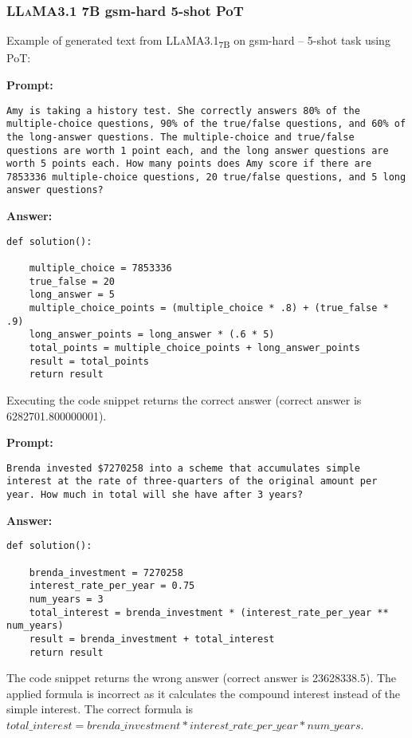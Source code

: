 	\subsubsection*{\textsc{LLaMA}3.1 7B gsm-hard 5-shot PoT}
	\noindent Example of generated text from \textsc{LLaMA}3.1\textsubscript{7B} on gsm-hard -- 5-shot task using PoT:
	\begin{displayquote}
		\textbf{Prompt:}
		\begin{Verbatim}[fontsize=\small,breaklines]
Amy is taking a history test. She correctly answers 80% of the multiple-choice questions, 90% of the true/false questions, and 60% of the long-answer questions. The multiple-choice and true/false questions are worth 1 point each, and the long answer questions are worth 5 points each. How many points does Amy score if there are 7853336 multiple-choice questions, 20 true/false questions, and 5 long answer questions?
    \end{Verbatim}
		\textbf{Answer:}
		\begin{Verbatim}[fontsize=\small,breaklines]
def solution():

    multiple_choice = 7853336
    true_false = 20
    long_answer = 5
    multiple_choice_points = (multiple_choice * .8) + (true_false * .9)
    long_answer_points = long_answer * (.6 * 5)
    total_points = multiple_choice_points + long_answer_points
    result = total_points
    return result
    \end{Verbatim}
	\end{displayquote}
	Executing the code snippet returns the correct answer (correct answer is 6282701.800000001).
	\begin{displayquote}
		\textbf{Prompt:}
		\begin{Verbatim}[fontsize=\small,breaklines]
Brenda invested $7270258 into a scheme that accumulates simple interest at the rate of three-quarters of the original amount per year. How much in total will she have after 3 years?
    \end{Verbatim}
		\textbf{Answer:}
		\begin{Verbatim}[fontsize=\small,breaklines]
def solution():

    brenda_investment = 7270258
    interest_rate_per_year = 0.75
    num_years = 3
    total_interest = brenda_investment * (interest_rate_per_year ** num_years)
    result = brenda_investment + total_interest
    return result
    \end{Verbatim}
	\end{displayquote}
	The code snippet returns the wrong answer (correct answer is 23628338.5).
	The applied formula is incorrect as it calculates the compound interest instead of the simple interest.
	The correct formula is $total\_interest = brenda\_investment * interest\_rate\_per\_year * num\_years$.